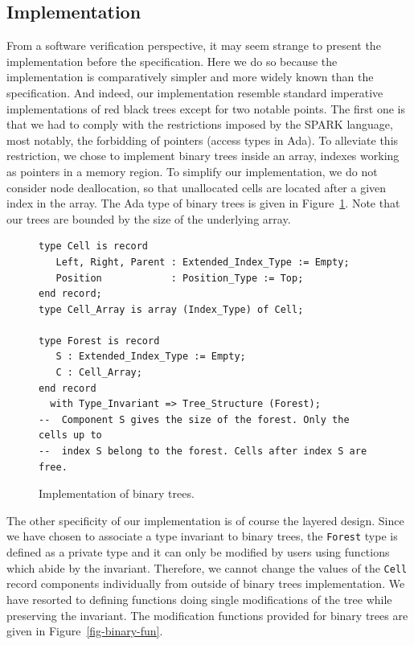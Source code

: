 \documentclass[11pt,a4paper]{article}
\newcommand{\spark}{SPARK\xspace}
\begin{document}
\subsection{Implementation}

From a software verification perspective, it may seem strange to present the implementation
before the specification. Here we do so because the implementation is comparatively
simpler and more widely known than the specification. And indeed, our implementation
resemble standard imperative implementations of red black trees except for two notable
points. The first one is that we had to comply with the restrictions imposed by the
\spark language, most notably, the forbidding of pointers (access types in Ada). To
alleviate this restriction, we chose to implement binary trees inside an array, indexes
working as pointers in a memory region. To simplify our implementation, we do not consider
node deallocation, so that unallocated cells are located after a given index in the array.
The Ada type of binary trees is given in Figure~\ref{fig-binary-typ}.
Note that our trees are bounded by the size of the underlying array.

\begin{figure}[ht]
\begin{small}
\begin{lstlisting}
type Cell is record
   Left, Right, Parent : Extended_Index_Type := Empty;
   Position            : Position_Type := Top;
end record;
type Cell_Array is array (Index_Type) of Cell;

type Forest is record
   S : Extended_Index_Type := Empty;
   C : Cell_Array;
end record
  with Type_Invariant => Tree_Structure (Forest);
--  Component S gives the size of the forest. Only the cells up to
--  index S belong to the forest. Cells after index S are free.
\end{lstlisting}
\end{small}
\caption{\label{fig-binary-typ} Implementation of binary trees.}
\end{figure}

The other specificity of our implementation is of course the layered design. Since we
have chosen to associate a type invariant to binary trees, the \texttt{Forest} type is defined as
a private type and it can only be modified by users using functions which abide by the
invariant. Therefore, we cannot change the values of the \texttt{Cell} record components individually
from outside of binary trees implementation. We have resorted to defining functions
doing single modifications of the tree while preserving the invariant. The modification
functions provided for binary trees are given in Figure~\ref{fig-binary-fun}.
\end{document}
